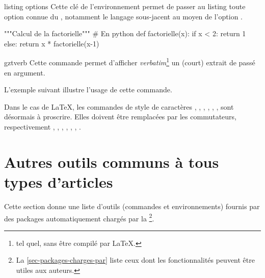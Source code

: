 \begin{docKey}{listing options}{}{}
  Cette clé de l'environnement  permet de passer au listing
  toute option connue du , notamment le langage sous-jacent
  au moyen de l'option .
\begin{bodycode}[listing and text,listing options={deletekeywords={listing,[2]style}}]
%
\begin{gztcode}[listing options={style=mon-style}]
"""Calcul de la factorielle""" # En python
def factorielle(x):
  if x < 2:
    return 1
  else:
    return x * factorielle(x-1)
\end{gztcode}
\end{bodycode}
\lstset{escapechar="}
\end{docKey}

\begin{docCommand}{gztverb}{}
  Cette commande permet d'afficher \emph{verbatim}\footnote{\Cad*{} tel quel,
    sans être compilé par \LaTeX{}.} un (court) extrait de  passé en
  argument.

  L'exemple suivant illustre l'usage de cette commande\conseilslatex.
\begin{bodycode}[listing and text,colback=white,listing options={deletekeywords={[3]style}}]
Dans le cas de \LaTeX, les commandes de style de caractères \gztverb{\bf},
\gztverb{\it}, \gztverb{\sf}, \gztverb{\tt}, \gztverb{\sc}, \gztverb{\sl},
\gztverb{\rm} sont désormais à proscrire. Elles doivent être remplacées par
les commutateurs, respectivement \gztverb{\bfseries}, \gztverb{\itshape},
\gztverb{\sffamily}, \gztverb{\ttfamily}, \gztverb{\scshape},
\gztverb{\slshape}, \gztverb{\rmfamily}.
\end{bodycode}
\end{docCommand}

\section{Autres outils communs à tous types d'articles}
\label{sec:outils-communs-tous-1}

Cette section donne une liste d'outils (commandes et environnements) fournis par
des packages automatiquement chargés par la \gztauthorcl\footnote{La
  \vref{sec-packages-charges-par} liste ceux dont les fonctionnalités peuvent
  être utiles aux auteurs.}.

